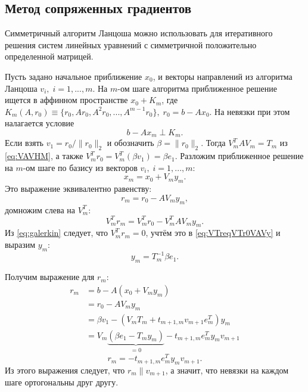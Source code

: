 \subsection[Метод сопряженных градиентов]{Метод сопряженных градиентов \cite{Saad2003}}
Симметричный алгоритм Ланцоша можно использовать для итеративного решения систем
линейных уравнений с симметричной положительно определенной матрицей.
\par Пусть задано начальное приближение $x_0$, и векторы направлений из алгоритма
Ланцоша $v_i,\;i=1,...,m$.
На $m$-ом шаге алгоритма приближенное решение ищется в аффинном пространстве $x_0 + K_m$, 
где $K_m\left(A,r_0\right) \equiv \{r_0,Ar_0,A^2r_0,...,A^{m-1}r_0\}, \; r_0 = b - Ax_0$.
На невязки при этом налагается условие 
\begin{equation}
    \label{eq:galerkin}
    b-Ax_m \perp K_m.
\end{equation}
Если взять $v_1 = r_0/\|r_0\|_2$ и 
обозначить $\beta = \|r_0\|_2$. Тогда $V_m^TAV_m = T_m$ из \eqref{eq:VAVHM}, а также $V_m^Tr_0 = V_m^T(\beta v_1)=\beta e_1$.
Разложим приближенное решение на $m$-ом шаге по базису из векторов $v_i,\;i=1,...,m$:
\begin{equation}
    x_m = x_0 + V_m y_m.
\end{equation} 
Это выражение эквивалентно равенству:
 \begin{equation}
    r_m = r_0 - AV_m y_m, 
 \end{equation}
домножим слева на $V_m^T$:
\begin{equation}
    \label{eq:VTreqVTr0VAVy}
    V_m^T r_m = V_m^T r_0 - V_m^T AV_m y_m.
\end{equation}
Из \eqref{eq:galerkin} следует, что $ V_m^T r_m = 0 $, учтём это в \eqref{eq:VTreqVTr0VAVy} 
и выразим $y_m$:
\begin{equation}
    y_m = T_m^{-1} \beta e_1.
\end{equation}

\par Получим выражение для $r_m$:
\begin{align*}
    r_m &= b - A(x_0 + V_m y_m) \\
        &= r_0 - AV_m y_m \\
        &= \beta v_1 - (V_m T_m + t_{m+1,m}v_{m+1}e_m^T)y_m \\
        &= V_m \underbrace{(\beta e_1 - T_m y_m)}_{=0} - t_{m+1,m} e_m^T y_m v_{m+1}
\end{align*}
\begin{equation}
    \label{eq:r_m_SL}
    r_m = - t_{m+1,m} e_m^T y_m v_{m+1}.
\end{equation}
Из этого выражения следует, что $r_m \parallel v_{m+1}$, а значит, что невязки на каждом шаге ортогональны друг другу.

